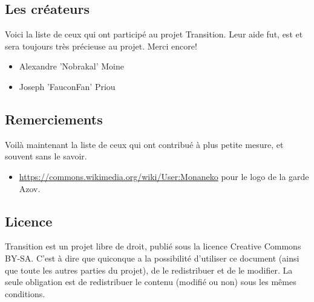 \documentclass{book}
\begin{document}
\subsection{Les créateurs}
Voici la liste de ceux qui ont participé au projet Transition. Leur aide fut, est et sera toujours très précieuse au projet. Merci encore!  
\begin{itemize}
\item Alexandre ’Nobrakal’ Moine 
\item Joseph ’FauconFan’ Priou
\end{itemize}
\subsection{Remerciements}
Voilà maintenant la liste de ceux qui ont contribué à plus petite mesure, et souvent sans le savoir. 
\begin{itemize}
	\item \url{https://commons.wikimedia.org/wiki/User:Monaneko} pour le logo de la garde Azov.
\end{itemize}
\subsection{Licence}
Transition est un projet libre de droit, publié sous la licence Creative Commons BY-SA. C'est à dire que quiconque a la possibilité d'utiliser ce document (ainsi que toute les autres parties du projet), de le redistribuer et de le modifier. La seule obligation est de redistribuer le contenu (modifié ou non) sous les mêmes conditions.
\end{document}
